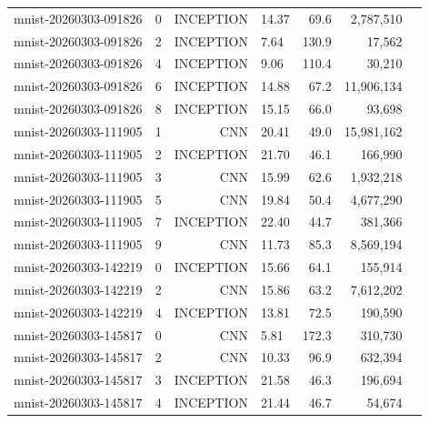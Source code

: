 \begin{tabular}{llrlrrr}
mnist-20260303-091826 & 0 & INCEPTION & 14.37 & 69.6 & 2,787,510 \\
mnist-20260303-091826 & 2 & INCEPTION & 7.64 & 130.9 & 17,562 \\
mnist-20260303-091826 & 4 & INCEPTION & 9.06 & 110.4 & 30,210 \\
mnist-20260303-091826 & 6 & INCEPTION & 14.88 & 67.2 & 11,906,134 \\
mnist-20260303-091826 & 8 & INCEPTION & 15.15 & 66.0 & 93,698 \\
mnist-20260303-111905 & 1 & CNN & 20.41 & 49.0 & 15,981,162 \\
mnist-20260303-111905 & 2 & INCEPTION & 21.70 & 46.1 & 166,990 \\
mnist-20260303-111905 & 3 & CNN & 15.99 & 62.6 & 1,932,218 \\
mnist-20260303-111905 & 5 & CNN & 19.84 & 50.4 & 4,677,290 \\
mnist-20260303-111905 & 7 & INCEPTION & 22.40 & 44.7 & 381,366 \\
mnist-20260303-111905 & 9 & CNN & 11.73 & 85.3 & 8,569,194 \\
mnist-20260303-142219 & 0 & INCEPTION & 15.66 & 64.1 & 155,914 \\
mnist-20260303-142219 & 2 & CNN & 15.86 & 63.2 & 7,612,202 \\
mnist-20260303-142219 & 4 & INCEPTION & 13.81 & 72.5 & 190,590 \\
mnist-20260303-145817 & 0 & CNN & 5.81 & 172.3 & 310,730 \\
mnist-20260303-145817 & 2 & CNN & 10.33 & 96.9 & 632,394 \\
mnist-20260303-145817 & 3 & INCEPTION & 21.58 & 46.3 & 196,694 \\
mnist-20260303-145817 & 4 & INCEPTION & 21.44 & 46.7 & 54,674 \\
\bottomrule
\end{tabular}